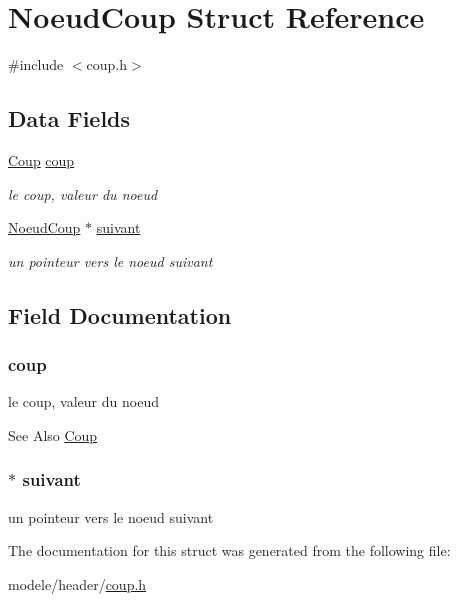 \hypertarget{struct_noeud_coup}{\section{Noeud\-Coup Struct Reference}
\label{struct_noeud_coup}
}


{\ttfamily \#include $<$coup.\-h$>$}

\subsection*{Data Fields}
\begin{DoxyCompactItemize}
\item 
\hyperlink{struct_coup}{Coup} \hyperlink{struct_noeud_coup_a1cdb5604ecc632b3055e4625a2bf2196}{coup}
\begin{DoxyCompactList}\small\item\em le coup, valeur du noeud \end{DoxyCompactList}\item 
\hyperlink{struct_noeud_coup}{Noeud\-Coup} $\ast$ \hyperlink{struct_noeud_coup_a2fa4eae8f807001cfeb0fb8f0d97a88d}{suivant}
\begin{DoxyCompactList}\small\item\em un pointeur vers le noeud suivant \end{DoxyCompactList}\end{DoxyCompactItemize}


\subsection{Field Documentation}
\hypertarget{struct_noeud_coup_a1cdb5604ecc632b3055e4625a2bf2196}{
\subsubsection[{coup}]{ coup}}\label{struct_noeud_coup_a1cdb5604ecc632b3055e4625a2bf2196}


le coup, valeur du noeud 

\begin{DoxySeeAlso}{See Also}
\hyperlink{struct_coup}{Coup} 
\end{DoxySeeAlso}
\hypertarget{struct_noeud_coup_a2fa4eae8f807001cfeb0fb8f0d97a88d}{
\subsubsection[{suivant}]{$\ast$ suivant}}\label{struct_noeud_coup_a2fa4eae8f807001cfeb0fb8f0d97a88d}


un pointeur vers le noeud suivant 



The documentation for this struct was generated from the following file\-:\begin{DoxyCompactItemize}
\item 
modele/header/\hyperlink{coup_8h}{coup.\-h}\end{DoxyCompactItemize}

